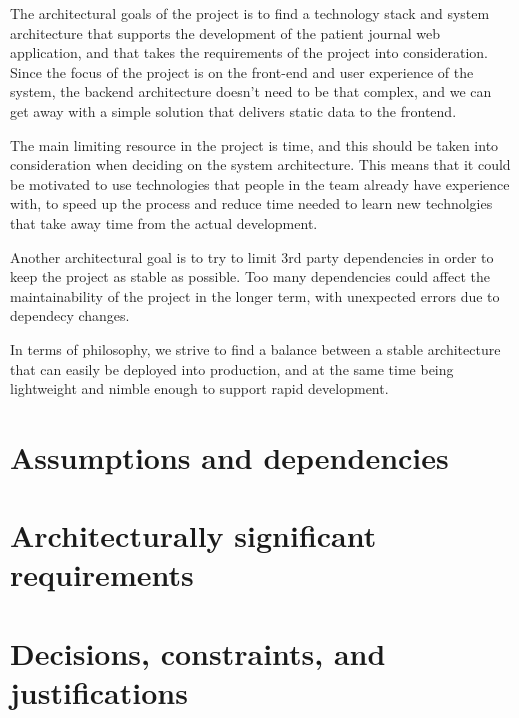 \documentclass{article}
\begin{document}
The architectural goals of the project is to find a technology stack and system architecture that supports the development of the patient journal web application, and that takes the requirements of the project into consideration. Since the focus of the project is on the front-end and user experience of the system, the backend architecture doesn't need to be that complex, and we can get away with a simple solution that delivers static data to the frontend.

The main limiting resource in the project is time, and this should be taken into consideration when deciding on the system architecture. This means that it could be motivated to use technologies that people in the team already have experience with, to speed up the process and reduce time needed to learn new technolgies that take away time from the actual development.

Another architectural goal is to try to limit 3rd party dependencies in order to keep the project as stable as possible. Too many dependencies could affect the maintainability of the project in the longer term, with unexpected errors due to dependecy changes.

In terms of philosophy, we strive to find a balance between a stable architecture that can easily be deployed into production, and at the same time being lightweight and nimble enough to support rapid development.

\section{Assumptions and dependencies}

\section{Architecturally significant requirements}

\section{Decisions, constraints, and justifications}
\end{document}
